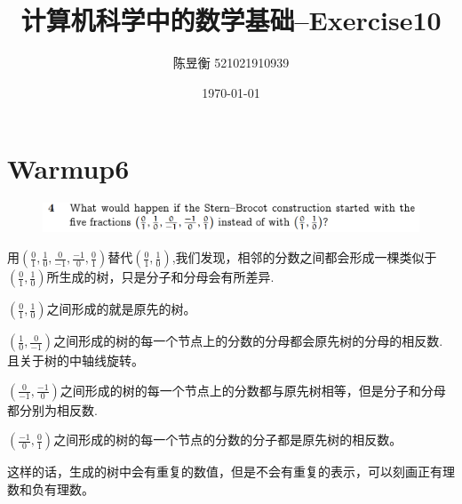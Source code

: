 \documentclass[]{article}
\title{计算机科学中的数学基础--Exercise10}
\author{陈昱衡 521021910939}
\date{\today}
\begin{document}
\maketitle


\section*{Warmup6}
\begin{figure}[H]
    \includegraphics[scale = 0.6]{2023-03-16-10-44-42.png}
\end{figure}
用$({\frac{0}{1},\frac{1}{0},\frac{0}{-1},\frac{-1}{0},\frac{0}{1}})$替代$(\frac{0}{1},\frac{1}{0})$,我们发现，相邻的分数之间都会形成一棵类似于$(\frac{0}{1},\frac{1}{0})$所生成的树，只是分子和分母会有所差异.\par 
$(\frac{0}{1},\frac{1}{0})$之间形成的就是原先的树。\par 
$(\frac{1}{0},\frac{0}{-1})$之间形成的树的每一个节点上的分数的分母都会原先树的分母的相反数.且关于树的中轴线旋转。\par
$(\frac{0}{-1},\frac{-1}{0})$之间形成的树的每一个节点上的分数都与原先树相等，但是分子和分母都分别为相反数.\par 
$(\frac{-1}{0},\frac{0}{1})$之间形成的树的每一个节点的分数的分子都是原先树的相反数。\par
这样的话，生成的树中会有重复的数值，但是不会有重复的表示，可以刻画正有理数和负有理数。
\end{document}
